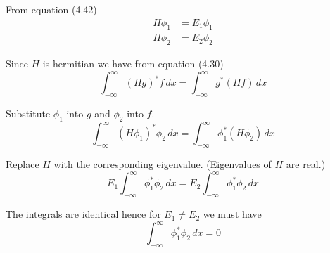 


From equation (4.42)
\begin{align*}
H\phi_1&=E_1\phi_1
\\
H\phi_2&=E_2\phi_2
\end{align*}

Since $H$ is hermitian we have from equation (4.30)
\begin{equation*}
\int_{-\infty}^\infty(Hg)^*f\,dx=\int_{-\infty}^\infty g^*(Hf)\,dx
\tag{4.30}
\end{equation*}

Substitute $\phi_1$ into $g$ and $\phi_2$ into $f$.
\begin{equation*}
\int_{-\infty}^\infty(H\phi_1)^*\phi_2\,dx=\int_{-\infty}^\infty \phi_1^*(H\phi_2)\,dx
\end{equation*}

Replace $H$ with the corresponding eigenvalue.
(Eigenvalues of $H$ are real.)
\begin{equation*}
E_1\int_{-\infty}^\infty\phi_1^*\phi_2\,dx=E_2\int_{-\infty}^\infty \phi_1^*\phi_2\,dx
\end{equation*}

The integrals are identical hence for $E_1\ne E_2$ we must have
\begin{equation*}
\int_{-\infty}^\infty\phi_1^*\phi_2\,dx=0
\end{equation*}



